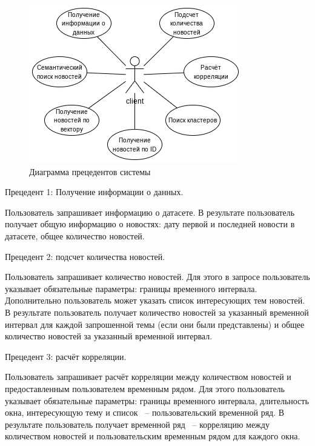 \begin{figure}[h]
    \centering
    \includegraphics[width=\linewidth]{images/use-case-diagram.png}
    \caption{Диаграмма прецедентов системы}
    \label{img:use-case-diagram}
\end{figure}

Прецедент 1: Получение информации о данных.

Пользователь запрашивает информацию о датасете. В результате пользователь получает общую информацию о новостях: дату первой и последней новости в датасете, общее количество новостей.

Прецедент 2: подсчет количества новостей.

Пользователь запрашивает количество новостей. Для этого в запросе пользователь указывает обязательные параметры: границы временного интервала. Дополнительно пользователь может указать список интересующих тем новостей. В результате пользователь получает количество новостей за указанный временной интервал для каждой запрошенной темы (если они были представлены) и общее количество новостей за указанный временной интервал.

Прецедент 3: расчёт корреляции.

Пользователь запрашивает расчёт корреляции между количеством новостей и предоставленным пользователем временным рядом. Для этого пользователь указывает обязательные параметры: границы временного интервала, длительность окна, интересующую тему и список ~-- пользовательский временной ряд. В результате пользователь получает временной ряд ~-- корреляцию между количеством новостей и пользовательским временным рядом для каждого окна.

